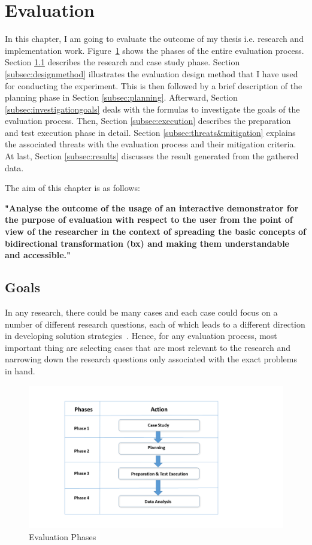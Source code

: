 \section{Evaluation}\label{sec:evaluation} 
In this chapter, I am going to evaluate the outcome of my thesis i.e. research and implementation work. 
Figure~\ref{fig:Evaluation_Phases} shows the phases of the entire evaluation process. Section \ref{subsec:goals} describes the research and case study phase. Section \ref{subsec:designmethod} illustrates the evaluation design method that I have used for conducting the experiment. This is then followed by a brief description of the planning phase in Section \ref{subsec:planning}. Afterward, Section \ref{subsec:investigationgoals} deals with the formulas to investigate the goals of the evaluation process. Then, Section \ref{subsec:execution} describes the preparation and test execution phase in detail. Section \ref{subsec:threats&mitigation} explains the associated threats with the evaluation process and their mitigation criteria. At last, Section \ref{subsec:results} discusses the result generated from the gathered data. 

The aim of this chapter is as follows: 

\textbf{"Analyse the outcome of the usage of an interactive demonstrator for the purpose of evaluation with respect to the user from the point of view of the researcher in the context of spreading the basic concepts of bidirectional transformation (bx) and making them understandable and accessible."}

\subsection{Goals}\label{subsec:goals}  
In any research, there could be many cases and each case could focus on a number of different research questions, each of which leads to a different direction in developing solution strategies~\cite{semethods}. Hence, for any evaluation process, most important thing are selecting cases that are most relevant to the research and narrowing down the research questions only associated with the exact problems in hand. 

\begin{figure}
	\includegraphics[width=1\textwidth]{figures/Evaluation_Phases}
	\caption{Evaluation Phases}
	\label{fig:Evaluation_Phases}
\end{figure}

